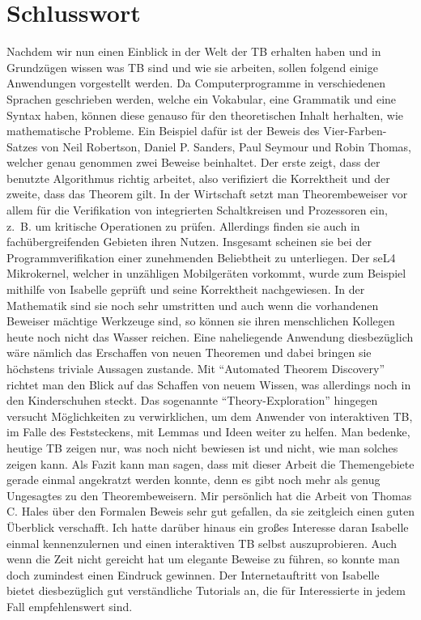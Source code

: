 \section{Schlusswort}
Nachdem wir nun einen Einblick in der Welt der TB erhalten haben und in Grundzügen wissen was TB sind und wie sie arbeiten, sollen folgend einige Anwendungen vorgestellt werden.
Da Computerprogramme in verschiedenen Sprachen geschrieben werden, welche ein Vokabular, eine Grammatik und eine Syntax haben, können diese genauso für den theoretischen Inhalt herhalten, wie mathematische Probleme.
Ein Beispiel dafür ist der Beweis des Vier-Farben-Satzes von Neil Robertson, Daniel P. Sanders, Paul Seymour und Robin Thomas, welcher genau genommen zwei Beweise beinhaltet.
Der erste zeigt, dass der benutzte Algorithmus richtig arbeitet, also verifiziert die Korrektheit und der zweite, dass das Theorem gilt.
In der Wirtschaft setzt man Theorembeweiser vor allem für die Verifikation von integrierten Schaltkreisen und Prozessoren ein, z.~B. um kritische Operationen zu prüfen.
Allerdings finden sie auch in fachübergreifenden Gebieten ihren Nutzen. Insgesamt scheinen sie bei der Programmverifikation einer zunehmenden Beliebtheit zu unterliegen.
Der seL4 Mikrokernel, welcher in unzähligen Mobilgeräten vorkommt, wurde zum Beispiel mithilfe von Isabelle geprüft und seine Korrektheit nachgewiesen.
In der Mathematik sind sie noch sehr umstritten und auch wenn die vorhandenen Beweiser mächtige Werkzeuge sind, so können sie ihren menschlichen Kollegen heute noch nicht das Wasser reichen.
Eine naheliegende Anwendung diesbezüglich wäre nämlich das Erschaffen von neuen Theoremen und dabei bringen sie höchstens triviale Aussagen zustande.
Mit \enquote{Automated Theorem Discovery}~\cite{Gao2014} richtet man den Blick auf das Schaffen von neuem Wissen, was allerdings noch in den Kinderschuhen steckt.
Das sogenannte \enquote{Theory-Exploration} hingegen versucht Möglichkeiten zu verwirklichen, um dem Anwender von interaktiven TB, im Falle des Feststeckens, mit Lemmas und Ideen weiter zu helfen.
Man bedenke, heutige TB zeigen nur, was noch nicht bewiesen ist und nicht, wie man solches zeigen kann.
Als Fazit kann man sagen, dass mit dieser Arbeit die Themengebiete gerade einmal angekratzt werden konnte, denn es gibt noch mehr als genug Ungesagtes zu den Theorembeweisern.
Mir persönlich hat die Arbeit von Thomas C. Hales über den Formalen Beweis sehr gut gefallen, da sie zeitgleich einen guten Überblick verschafft.
Ich hatte darüber hinaus ein großes Interesse daran Isabelle einmal kennenzulernen und einen interaktiven TB selbst auszuprobieren.
Auch wenn die Zeit nicht gereicht hat um elegante Beweise zu führen, so konnte man doch zumindest einen Eindruck gewinnen.
Der Internetauftritt von Isabelle~\cite{isabellewebpage} bietet diesbezüglich gut verständliche Tutorials an, die für Interessierte in jedem Fall empfehlenswert sind.
